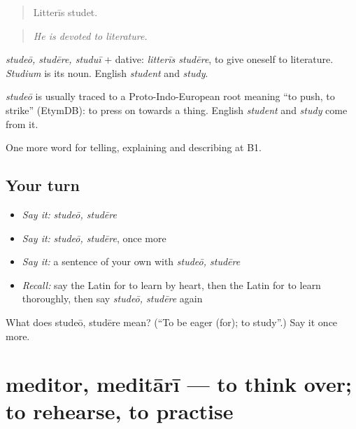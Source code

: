 \begin{quote}
Litterīs studet.
\end{quote}

\begin{quote}
\emph{He is devoted to literature.}
\end{quote}

\emph{studeō, studēre, studuī} + dative: \emph{litterīs studēre}, to give oneself to literature. \emph{Studium} is its noun. English \emph{student} and \emph{study}.

\begin{cousinweb}
\emph{studeō} is usually traced to a Proto-Indo-European root meaning \textquotedblleft{}to push, to strike\textquotedblright{} (EtymDB): to press on towards a thing. English \emph{student} and \emph{study} come from it.
\end{cousinweb}

\begin{grammarlens}[title={What you've built}]
One more word for telling, explaining and describing at B1.
\end{grammarlens}

\subsection*{Your turn}
\begin{itemize}
\raggedright
  \item \emph{Say it:} \emph{studeō, studēre}
  \item \emph{Say it:} \emph{studeō, studēre}, once more
  \item \emph{Say it:} a sentence of your own with \emph{studeō, studēre}
  \item \emph{Recall:} say the Latin for to learn by heart, then the Latin for to learn thoroughly, then say \emph{studeō, studēre} again
\end{itemize}

\begin{tcolorbox}[breakable,colback=teal!4,colframe=teal!35!black,title={Before you move on}]
What does studeō, studēre mean? (\textquotedblleft{}To be eager (for); to study\textquotedblright{}.) Say it once more.
\end{tcolorbox}
\section[meditor, meditārī]{meditor, meditārī — to think over; to rehearse, to practise}

\label{lesson:LA-C402-meditor}



